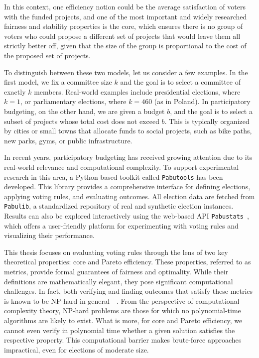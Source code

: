 \documentclass[magisterska,en]{pracamgr}
\begin{document}
In this context,  one efficiency notion could be the average satisfaction of voters with the funded projects, and one of the most important and widely researched fairness and stability properties is the core, which ensures there is no group of voters who could propose a different set of projects that would leave them all strictly better off, given that the size of the group is proportional to the cost of the proposed set of projects.

To distinguish between these two models, let us consider a few examples. In the first model, we fix a committee size $k$ and the goal is to select a committee of exactly $k$ members. Real-world examples include presidential elections, where $k=1$, or parliamentary elections, where $k=460$ (as in Poland). In participatory budgeting, on the other hand, we are given a budget $b$, and the goal is to select a subset of projects whose total cost does not exceed $b$. This is typically organized by cities or small towns that allocate funds to social projects, such as bike paths, new parks, gyms, or public infrastructure.

In recent years, participatory budgeting has received growing attention due to its real-world relevance and computational complexity. To support experimental research in this area, a Python-based toolkit called \texttt{Pabutools}\cite{1} has been developed. This library provides a comprehensive interface for defining elections, applying voting rules, and evaluating outcomes. All election data are fetched from \texttt{Pabulib}\cite{2}, a standardized repository of real and synthetic election instances. Results can also be explored interactively using the web-based API \texttt{Pabustats}~\cite{3}, which offers a user-friendly platform for experimenting with voting rules and visualizing their performance.

This thesis focuses on evaluating voting rules through the lens of two key theoretical properties: core and Pareto efficiency. These properties, referred to as metrics, provide formal guarantees of fairness and optimality. While their definitions are mathematically elegant, they pose significant computational challenges. In fact, both verifying and finding outcomes that satisfy these metrics is known to be NP-hard in general~\cite{4}~\cite{5}. From the perspective of computational complexity theory, NP-hard problems are those for which no polynomial-time algorithms are likely to exist. What is more, for core and Pareto efficiency, we cannot even verify in polynomial time whether a given solution satisfies the respective property. This computational barrier makes brute-force approaches impractical, even for elections of moderate size.
\end{document}

